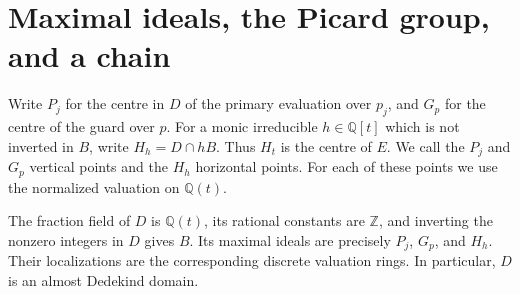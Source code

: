 \section{Maximal ideals, the Picard group, and a chain}
\label{sec:structure}

Write $P_j$ for the centre in $D$ of the primary evaluation over $p_j$, and $G_p$ for the centre of the guard over $p$.
For a monic irreducible $h \in \mathbb{Q}[t]$ which is not inverted in $B$, write $H_h = D \cap hB$.
Thus $H_t$ is the centre of $E$.
We call the $P_j$ and $G_p$ vertical points and the $H_h$ horizontal points.
For each of these points we use the normalized valuation on $\mathbb{Q}(t)$.

\begin{lemma}
    \label{lem:stalks}
    The fraction field of $D$ is $\mathbb{Q}(t)$, its rational constants are $\mathbb{Z}$, and inverting the nonzero integers in $D$ gives $B$.
    Its maximal ideals are precisely $P_j$, $G_p$, and $H_h$.
    Their localizations are the corresponding discrete valuation rings.
    In particular, $D$ is an almost Dedekind domain.
\end{lemma}


